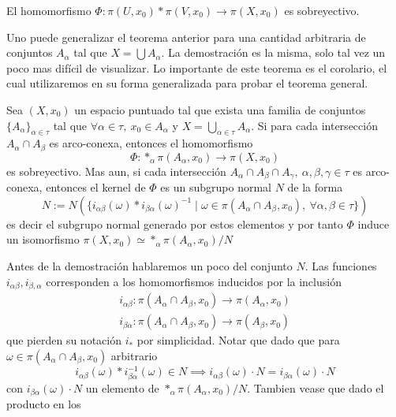 \begin{corolario}\label{cor:sobre-van}
  El homomorfismo \(\Phi : \pi (U, x_0) * \pi (V, x_0) \to \pi (X,
  x_0)\) es sobreyectivo.
\end{corolario}
Uno puede generalizar el teorema anterior para una cantidad arbitraria
de conjuntos \(A_\alpha\) tal que \(X = \bigcup A_\alpha\). La
demostración es la misma, solo tal vez un poco mas difícil de
visualizar. Lo importante de este teorema es el corolario, el cual
utilizaremos en su forma generalizada para probar el teorema general.

\begin{teorema}
  Sea \((X, x_0)\) un espacio puntuado tal que exista una familia de
  conjuntos \(\{A_\alpha\}_{\alpha \in \tau}\) tal que \(\forall \alpha
  \in \tau,\ x_0 \in
  A_\alpha\) y \( X = \bigcup_{\alpha \in \tau} A_\alpha\). Si para cada
  intersección \(A_\alpha \cap A_\beta\) es arco-conexa, entonces el
  homomorfismo
  \[ \Phi : *_\alpha \pi (A_\alpha, x_0) \to \pi (X, x_0) \]
  es sobreyectivo. Mas aun, si cada intersección \(A_\alpha \cap A_\beta
  \cap A_\gamma,\ \alpha, \beta, \gamma \in \tau\) es arco-conexa,
  entonces el kernel de \(\Phi\) es un subgrupo normal \(N\) de la forma
  \[
    N := N \left( \{ i_{\alpha \beta} (\omega) * i_{\beta \alpha} (\omega)^{-1}
    \mid \omega \in \pi \left( A_\alpha \cap A_\beta, x_0 \right),\
    \forall \alpha ,\beta \in \tau \} \right)
  \]
  es decir el subgrupo normal generado por estos elementos y por tanto
  \(\Phi\) induce un isomorfismo \(\pi (X, x_0) \simeq *_\alpha \pi
  (A_\alpha, x_0) / N \)
\end{teorema}
Antes de la demostración hablaremos un poco del conjunto \(N\). Las
funciones \(i_{\alpha \beta}, i_{\beta, \alpha}\) corresponden a los
homomorfismos inducidos por la inclusión
\begin{gather*}
  i_{\alpha \beta} : \pi (A_\alpha \cap A_\beta , x_0 ) \longrightarrow \pi (A_\alpha, x_0) \\
  i_{\beta \alpha} : \pi (A_\alpha \cap A_\beta , x_0 ) \longrightarrow \pi (A_\beta, x_0)
\end{gather*}
que pierden su notación \(i_*\) por simplicidad. Notar que dado que
para \(\omega \in \pi (A_\alpha \cap A_\beta , x_0)\) arbitrario
\[ i_{\alpha \beta} (\omega) * i_{\beta \alpha}^{-1} (\omega) \in N
  \implies i_{\alpha \beta} (\omega) \cdot N = i_{\beta
\alpha} (\omega) \cdot N \]
con \(i_{\beta \alpha} (\omega) \cdot N\) un elemento de \(*_\alpha
\pi (A_\alpha , x_0) / N\). Tambien vease que dado el producto en los
